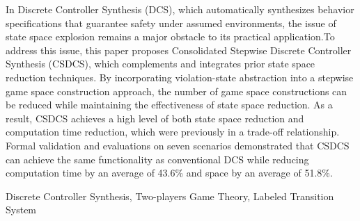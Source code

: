 \documentclass[submit]{ipsj}
\begin{document}
\begin{eabstract}

In Discrete Controller Synthesis (DCS), which automatically synthesizes behavior specifications that guarantee safety under assumed environments, the issue of state space explosion remains a major obstacle to its practical application.To address this issue, this paper proposes Consolidated Stepwise Discrete Controller Synthesis (CSDCS), which complements and integrates prior state space reduction techniques. By incorporating violation-state abstraction into a stepwise game space construction approach, the number of game space constructions can be reduced while maintaining the effectiveness of state space reduction. As a result, CSDCS achieves a high level of both state space reduction and computation time reduction, which were previously in a trade-off relationship. Formal validation and evaluations on seven scenarios demonstrated that CSDCS can achieve the same functionality as conventional DCS while reducing computation time by an average of 43.6\% and space by an average of 51.8\%.
\end{eabstract}
\begin{ekeyword}
Discrete Controller Synthesis, Two-players Game Theory, Labeled Transition System
\end{ekeyword}

\maketitle
\end{document}
